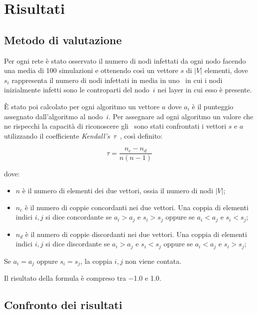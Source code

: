\chapter{Risultati}

\section{Metodo di valutazione}

Per ogni rete è stato osservato il numero di nodi infettati da ogni nodo facendo una media di \num{100} simulazioni e 
ottenendo così un vettore $s$ di $|V|$ elementi, dove $s_i$ rappresenta il numero di nodi 
infettati in media in uno \spproc\ in cui i nodi inizialmente infetti sono le controparti del 
nodo~$i$ nei layer in cui esso è presente.

È stato poi calcolato per ogni algoritmo un vettore $a$ dove $a_i$ 
è il punteggio assegnato dall'algoritmo al nodo~$i$.
Per assegnare ad ogni algoritmo un valore che ne rispecchi la capacità di riconoscere 
gli \infsp\ sono stati confrontati i vettori $s$ e $a$ utilizzando il coefficiente 
\textit{Kendall's}~$\tau$~\cite{kendall:tau}, 
così definito:

\begin{equation}
    \tau = \frac{n_c - n_d}{n(n-1)}
\end{equation}

dove:
\begin{itemize}
    \item $n$ è il numero di elementi dei due vettori, ossia il numero di nodi $|V|$;
    \item $n_c$ è il numero di coppie concordanti nei due vettori. Una coppia di elementi 
            indici $i, j$ si dice concordante se $a_i > a_j$ e $s_i > s_j$ oppure se $a_i < a_j$ e $s_i < s_j$;
    \item $n_d$ è il numero di coppie discordanti nei due vettori. Una coppia di elementi 
    indici $i, j$ si dice discordante se $a_i > a_j$ e $s_i < s_j$ oppure se $a_i < a_j$ e $s_i > s_j$;    
\end{itemize}

Se $a_i = a_j$ oppure $s_i = s_j$, la coppia $i, j$ non viene contata.

Il risultato della formula è compreso tra \num{-1.0} e {1.0}.

\section{Confronto dei risultati}

